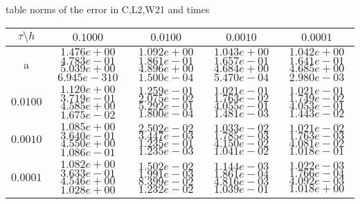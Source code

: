 
\begin{center}
table norms of the error in C,L2,W21 and times
\\[2.0ex]  
  
\begin{tabular}{|c|c|c|c|c|} \hline
$\tau\setminus h$ & $0.1000$& $0.0100$& $0.0010$& $0.0001$\\ \hline

a & $1.476e+00$ $4.783e-01$ $5.039e+00$ $6.945e-310$ &$1.092e+00$ $1.861e-01$ $4.896e+00$ $1.500e-04$ &$1.043e+00$ $1.657e-01$ $4.684e+00$ $5.470e-04$ &$1.042e+00$ $1.641e-01$ $4.685e+00$ $2.980e-03$  \\ \hline
$0.0100$ & $1.120e+00$ $3.719e-01$ $4.585e+00$ $1.675e-02$ &$1.259e-01$ $2.075e-02$ $5.292e-01$ $1.800e-04$ &$1.021e-01$ $1.763e-02$ $4.055e-01$ $1.481e-03$ &$1.021e-01$ $1.749e-02$ $4.053e-01$ $1.443e-02$  \\ \hline
$0.0010$ & $1.085e+00$ $3.640e-01$ $4.550e+00$ $1.086e-01$ &$2.502e-02$ $3.447e-03$ $1.235e-01$ $1.235e-03$ &$1.033e-02$ $1.785e-03$ $4.150e-02$ $1.041e-02$ &$1.021e-02$ $1.763e-03$ $4.081e-02$ $1.018e-01$  \\ \hline
$0.0001$ & $1.082e+00$ $3.633e-01$ $4.546e+00$ $1.028e+00$ &$1.502e-02$ $1.991e-03$ $8.399e-02$ $1.232e-02$ &$1.144e-03$ $1.861e-04$ $4.816e-03$ $1.039e-01$ &$1.022e-03$ $1.766e-04$ $4.092e-03$ $1.018e+00$  \\ \hline

\end{tabular}\\[20pt]
\end{center}

